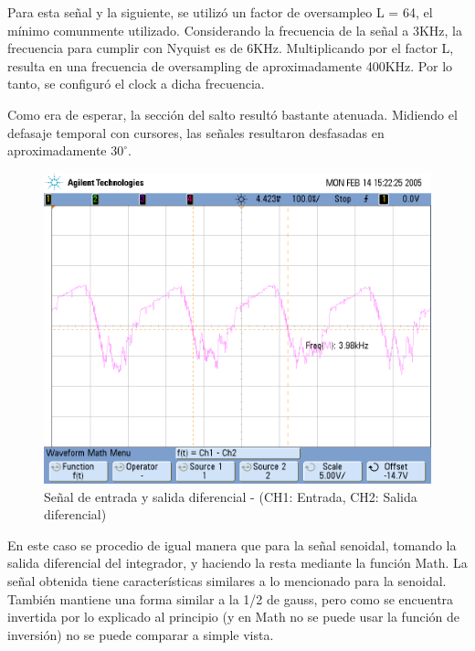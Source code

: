 \documentclass[assd_tp3_main.tex]{subfiles}
\begin{document}
Para esta señal y la siguiente, se utilizó un factor de oversampleo L = 64, el mínimo comunmente utilizado. Considerando la frecuencia de la señal a 3KHz, la frecuencia para cumplir con Nyquist es de 6KHz. Multiplicando por el factor L, resulta en una frecuencia de oversampling de aproximadamente 400KHz. Por lo tanto, se configuró el clock a dicha frecuencia.\par
Como era de esperar, la sección del salto resultó bastante atenuada. Midiendo el defasaje temporal con cursores, las señales resultaron desfasadas en aproximadamente $30^{\circ}$.
\newpage
\begin{figure}[!ht]
\begin{centering}
\includegraphics[scale=0.25]{../EJ4/Mediciones/0.5Gauss/dif_gaus.png}
\par\end{centering}
\caption{Señal de entrada y salida diferencial - (CH1: Entrada, CH2: Salida diferencial)}
\end{figure}

En este caso se procedio de igual manera que para la señal senoidal, tomando la salida diferencial del integrador, y haciendo la resta mediante la función Math. La señal obtenida tiene características similares a lo mencionado para la senoidal. También mantiene una forma similar a la 1/2 de gauss, pero como se encuentra invertida por lo explicado al principio (y en Math no se puede usar la función de inversión) no se puede comparar a simple vista.
\end{document}
